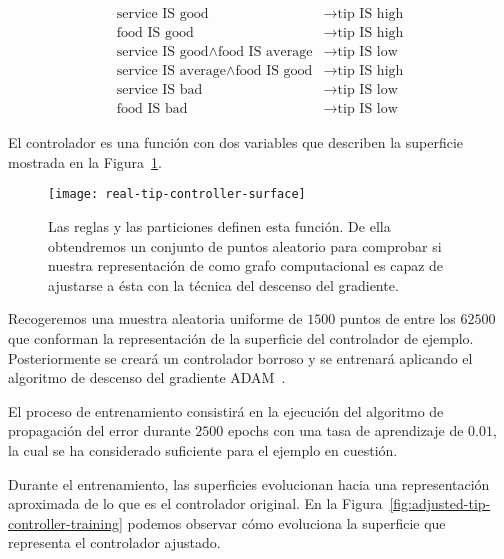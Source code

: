 \begin{align}
	\text{service IS good}                              &\rightarrow \text{tip IS high}\nonumber\\
	\text{food IS good}                                 &\rightarrow \text{tip IS high}\nonumber\\
	\text{service IS good} \land \text{food IS average} &\rightarrow \text{tip IS low}\nonumber\\
	\text{service IS average} \land \text{food IS good} &\rightarrow \text{tip IS high}\nonumber\\
	\text{service IS bad}                               &\rightarrow \text{tip IS low}\nonumber\\
	\text{food IS bad}                                  &\rightarrow \text{tip IS low}
\end{align}

El controlador es una función con dos variables que describen la superficie mostrada en la Figura~\ref{fig:real-tip-controller-surface}.

\begin{figure}
	\centering
	\texttt{[image: real-tip-controller-surface]}
	\caption[Superficie de la función que modela el  de ejemplo]{Las reglas y las particiones definen esta función. De ella obtendremos un conjunto de puntos aleatorio para comprobar si nuestra representación de  como grafo computacional es capaz de ajustarse a ésta con la técnica del descenso del gradiente.}
	\label{fig:real-tip-controller-surface}
\end{figure}

Recogeremos una muestra aleatoria uniforme de $1500$ puntos de entre los $62500$ que conforman la representación de la superficie del controlador de ejemplo. Posteriormente se creará un controlador borroso y se entrenará aplicando el algoritmo de descenso del gradiente ADAM~\cite{kingma2014adam}.

El proceso de entrenamiento consistirá en la ejecución del algoritmo de propagación del error durante $2500$ epochs con una tasa de aprendizaje de $0.01$, la cual se ha considerado suficiente para el ejemplo en cuestión.

Durante el entrenamiento, las superficies evolucionan hacia una representación aproximada de lo que es el controlador original. En la Figura~\ref{fig:adjusted-tip-controller-training} podemos observar cómo evoluciona la superficie que representa el controlador ajustado.


